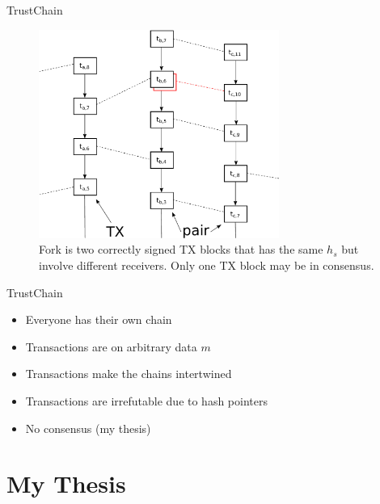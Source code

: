 \documentclass{beamer}
\begin{document}
\begin{frame}{TrustChain}{}

  \begin{figure}[h]
  \includegraphics[width=0.7\textwidth]{figures/trustchain-bad}
  \centering
  \caption{Fork is two correctly signed TX blocks that has the same $h_s$ but
    involve different receivers. Only one TX block may be in consensus.}
  \end{figure}

\end{frame}

\begin{frame}{TrustChain}
  \begin{itemize}
    \item Everyone has their own chain
    \item Transactions are on arbitrary data $m$
    \item Transactions make the chains intertwined
    \item Transactions are irrefutable due to hash pointers
    \item No consensus (my thesis)
  \end{itemize}
\end{frame}

\section{My Thesis}
\end{document}
